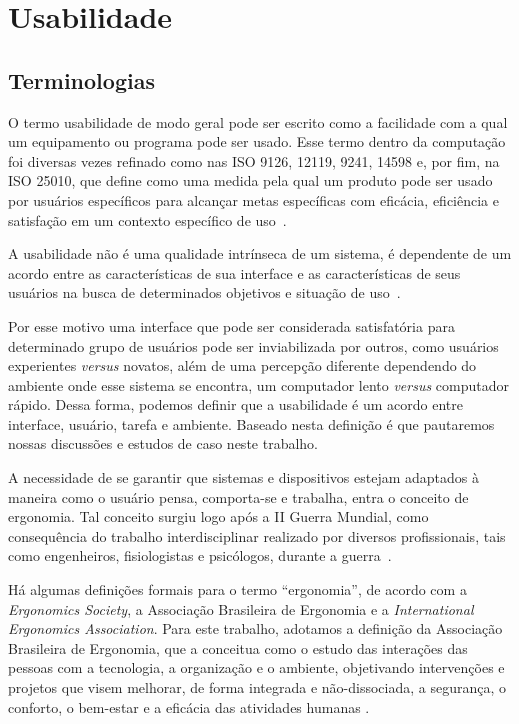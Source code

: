 \chapter{Usabilidade}
\label{cap-usabilidade}

\section{Terminologias}
\label{sec-terminologias}


O termo usabilidade de modo geral pode ser escrito como a facilidade com a qual
um equipamento ou programa pode ser usado. Esse termo dentro da computação foi
diversas vezes refinado como nas ISO 9126, 12119, 9241, 14598 e, por fim, na ISO
25010, que define como uma medida pela qual um produto pode ser usado por
usuários específicos para alcançar metas específicas com eficácia, eficiência e
satisfação em um contexto específico de uso~\cite{iso25010}.

%
A usabilidade não é uma qualidade intrínseca de um sistema, é dependente de um
acordo entre as características de sua interface e as características de seus
usuários na busca de determinados objetivos e situação de uso~\cite{cybis2010}.

%
Por esse motivo uma interface que pode ser considerada satisfatória para
determinado grupo de usuários pode ser inviabilizada por outros, como usuários
experientes \textit{versus} novatos, além de uma percepção diferente dependendo
do ambiente onde esse sistema se encontra, um computador lento \textit{versus}
computador rápido.
%
Dessa forma, podemos definir que a usabilidade é um acordo entre interface,
usuário, tarefa e ambiente. Baseado nesta definição é que pautaremos nossas
discussões e estudos de caso neste trabalho.

%
A necessidade de se garantir que sistemas e dispositivos estejam
adaptados à maneira como o usuário pensa, comporta-se e trabalha, entra o
conceito de ergonomia.
%
Tal conceito surgiu logo após a II Guerra Mundial, como consequência do trabalho
interdisciplinar realizado por diversos profissionais, tais como engenheiros,
fisiologistas e psicólogos, durante a guerra~\cite{lida2005}.

%
Há algumas definições formais para o termo ``ergonomia'', de acordo com a
\textit{Ergonomics Society}, a Associação Brasileira de Ergonomia e a 
\textit{International Ergonomics Association}.
%
Para este trabalho, adotamos a definição da Associação Brasileira de Ergonomia,
que a conceitua como o estudo das interações das pessoas com a tecnologia, a
organização e o ambiente, objetivando intervenções e projetos que visem
melhorar, de forma integrada e não-dissociada, a segurança, o conforto, o
bem-estar e a eficácia das atividades humanas \cite{abergo2013}.

